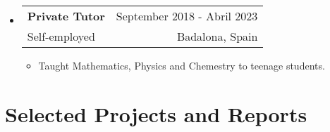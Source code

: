 \documentclass[a4paper,11pt]{article}
\makeatletter
\newcommand{\resumeQuadHeading}[4]{
  \item
  \begin{tabular*}{0.96\textwidth}[t]{l@{\extracolsep{\fill}}r}
    \textbf{#1} & \small #2 \\
    \small#3 & \small #4 \\
  \end{tabular*}
}
\newcommand{\resumeHeadingListStart}{
  \begin{itemize}[leftmargin=0.15in, label={}]
}
\newcommand{\resumeHeadingListEnd}{\end{itemize}}
\makeatother
\begin{document}
\resumeHeadingListStart{}
\resumeQuadHeading{Private Tutor}{September 2018 - Abril 2023}
{Self-employed}{Badalona, Spain}
\begin{itemize}[leftmargin=3em, itemsep=0.1em, topsep=2pt]
  \item \small Taught Mathematics, Physics and Chemestry to teenage students.
\end{itemize}
\resumeHeadingListEnd{}



\section{Selected Projects and Reports}
\end{document}
